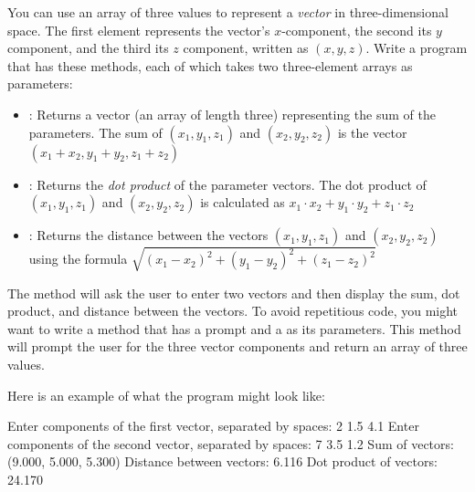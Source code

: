 \begin{exercise}
You can use an array of three  values to represent a {\em vector} in three-dimensional space. The first element represents the vector's $x$-component, the second its $y$ component, and the third its $z$ component, written as $(x, y, z)$. Write a program that has these methods, each of which takes two three-element arrays as parameters:
\begin{itemize}
\item {}: Returns a vector (an array of length three) representing the sum of the parameters. The sum of $(x_1, y_1, z_1)$ and $(x_2, y_2, z_2)$ is the vector $(x_1 + x_2, y_1 + y_2, z_1 + z_2)$
\item {}: Returns the {\em dot product} of the parameter vectors. The dot product of  $(x_1, y_1, z_1)$ and $(x_2, y_2, z_2)$ is calculated as $x_1\cdot x_2 + y_1\cdot y_2 + z_1\cdot z_2$ 
\item {}: Returns the distance between the vectors $(x_1, y_1, z_1)$ and $(x_2, y_2, z_2)$ using the formula $\sqrt{(x_1 - x_2)^2 + (y_1 - y_2)^2 + (z_1 - z_2)^2}$
\end{itemize}

The  method will ask the user to enter two vectors and then display the sum, dot product, and distance between the vectors. To avoid repetitious code, you might want to write a  method that has a prompt and a  as its parameters. This method will prompt the user for the three vector components and return an array of three  values.

Here is an example of what the program might look like:

\begin{stdout}
Enter components of the first vector,
separated by spaces: 2 1.5 4.1
Enter components of the second vector,
separated by spaces: 7 3.5 1.2
Sum of vectors: (9.000, 5.000, 5.300)
Distance between vectors: 6.116
Dot product of vectors: 24.170
\end{stdout}

\end{exercise}
